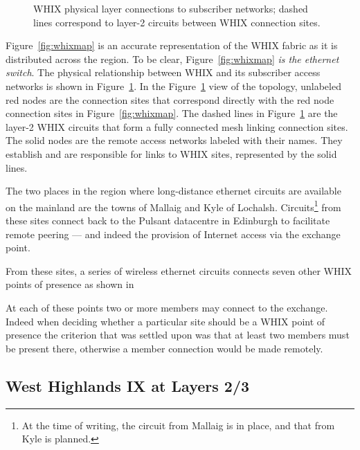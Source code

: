 \begin{figure}[h]
  \resizebox{\linewidth}{!}{
    \begin{tikzpicture}
      \whixmeshdiagram
    \end{tikzpicture}
  }
  \caption{WHIX physical layer connections to subscriber networks; dashed lines correspond to layer-2 circuits between WHIX connection sites.}
  \label{fig:phytop}
\end{figure}

Figure~\ref{fig:whixmap} is an accurate representation of the WHIX fabric as it
is distributed across the region. To be clear, Figure~\ref{fig:whixmap} \emph{is
the ethernet switch}. The physical relationship between WHIX and its subscriber
access networks is shown in Figure~\ref{fig:phytop}.
In the Figure~\ref{fig:phytop} view of the topology, unlabeled red nodes are the
connection sites that correspond directly with the red node connection sites in
Figure~\ref{fig:whixmap}. The dashed lines in Figure~\ref{fig:phytop} are the
layer-2 WHIX circuits that form a fully connected mesh linking connection sites.
The solid nodes are the remote access networks labeled with their names. They
establish and are responsible for links to WHIX sites, represented by the solid
lines.

The two places in the region where long-distance ethernet circuits are
available on the mainland are the towns of Mallaig and Kyle of
Lochalsh. Circuits\footnote{At the time of writing, the circuit from
Mallaig is in place, and that from Kyle is planned.} from these sites
connect back to the Pulsant datacentre in Edinburgh to facilitate
remote peering --- and indeed the provision of Internet access via the
exchange point.


From these sites, a series of wireless ethernet circuits connects
seven other \ac{WHIX} points of presence as shown in



At each of these points two or more members may connect to the
exchange. Indeed when deciding whether a particular site should be
a \ac{WHIX} point of presence the criterion that was settled upon was
that at least two members must be present there, otherwise a member
connection would be made remotely.




\subsection{West Highlands IX at Layers 2/3}


